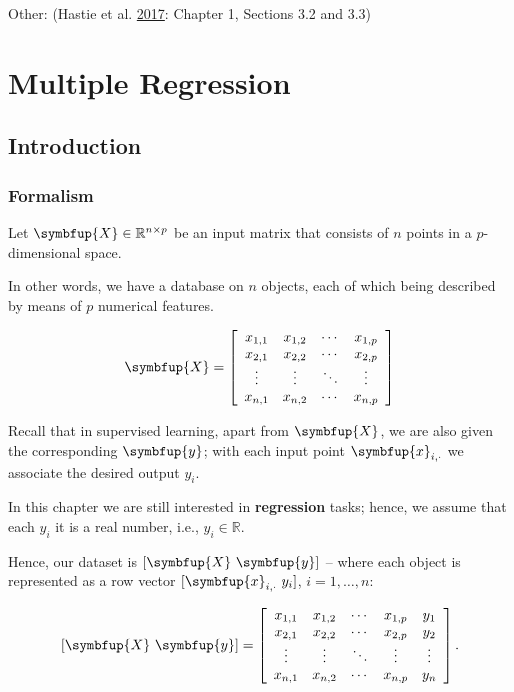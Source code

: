 \documentclass[10pt,b5paper,krantz1]{krantz}
\renewcommand{\mathbf}[1]{\symbfup{#1}}
\begin{document}
Other: (Hastie et al. \protect\hyperlink{ref-esl}{2017}: Chapter 1, Sections 3.2 and 3.3)

\hypertarget{multiple-regression}{%
\chapter{Multiple Regression}\label{multiple-regression}}

\hypertarget{introduction-2}{%
\section{Introduction}\label{introduction-2}}

\hypertarget{formalism-1}{%
\subsection{Formalism}\label{formalism-1}}

Let \(\mathbf{X}\in\mathbb{R}^{n\times p}\) be an input matrix
that consists of \(n\) points in a \(p\)-dimensional space.

In other words, we have a database on \(n\) objects, each of which
being described by means of \(p\) numerical features.

\[
\mathbf{X}=
\left[
\begin{array}{cccc}
x_{1,1} & x_{1,2} & \cdots & x_{1,p} \\
x_{2,1} & x_{2,2} & \cdots & x_{2,p} \\
\vdots & \vdots & \ddots & \vdots \\
x_{n,1} & x_{n,2} & \cdots & x_{n,p} \\
\end{array}
\right]
\]

Recall that in supervised learning,
apart from \(\mathbf{X}\), we are also given the corresponding \(\mathbf{y}\);
with each input point \(\mathbf{x}_{i,\cdot}\) we associate the desired output \(y_i\).

In this chapter we are still interested in \textbf{regression} tasks;
hence, we assume that each \(y_i\)
it is a real number, i.e., \(y_i\in\mathbb{R}\).

Hence, our dataset is \([\mathbf{X}\ \mathbf{y}]\) --
where each object is represented as a row vector
\([\mathbf{x}_{i,\cdot}\ y_i]\), \(i=1,\dots,n\):

\[
[\mathbf{X}\ \mathbf{y}]=
\left[
\begin{array}{ccccc}
x_{1,1} & x_{1,2} & \cdots & x_{1,p} & y_1\\
x_{2,1} & x_{2,2} & \cdots & x_{2,p} & y_2\\
\vdots & \vdots & \ddots & \vdots    & \vdots\\
x_{n,1} & x_{n,2} & \cdots & x_{n,p} & y_n\\
\end{array}
\right].
\]
\end{document}
